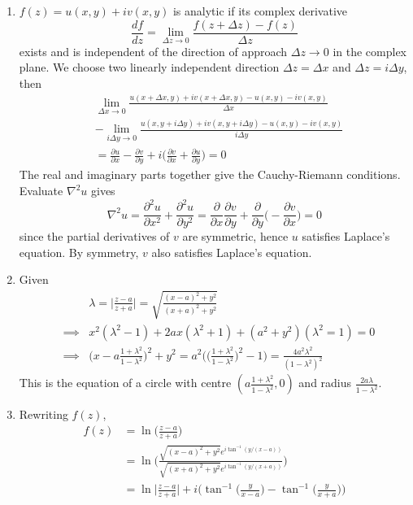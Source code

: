 \documentclass[a4paper]{article}
\begin{document}
\begin{ans}\leavevmode
\begin{enumerate}[label=(\roman*)]
\item $f(z)=u(x,y)+iv(x,y)$ is analytic if its complex derivative
$$\frac{df}{dz}=\lim_{\Delta z\rightarrow0}\frac{f(z+\Delta z)-f(z)}{\Delta z}$$
exists and is independent of the direction of approach $\Delta z\rightarrow 0$ in the complex plane. We choose two linearly independent direction $\Delta z=\Delta x$ and $\Delta z=i\Delta y$, then
\begin{align}
    &\lim_{\Delta x\rightarrow 0}\frac{u(x+\Delta x,y)+iv(x+\Delta x,y)-u(x,y)-iv(x,y)}{\Delta x}\nonumber\\&-\lim_{i\Delta y\rightarrow0}\frac{u(x,y+i\Delta y)+iv(x,y+i\Delta y)-u(x,y)-iv(x,y)}{i\Delta y}\nonumber\\&=\frac{\partial u}{\partial x}-\frac{\partial v}{\partial y}+i\bigg(\frac{\partial v}{\partial x}+\frac{\partial u}{\partial y}\bigg)=0\nonumber
\end{align}
The real and imaginary parts together give the Cauchy-Riemann conditions. Evaluate $\nabla^2u$ gives
$$\nabla^2u=\frac{\partial^2u}{\partial x^2}+\frac{\partial^2u}{\partial y^2}=\frac{\partial}{\partial x}\frac{\partial v}{\partial y}+\frac{\partial}{\partial y}\bigg(-\frac{\partial v}{\partial x}\bigg)=0$$
since the partial derivatives of $v$ are symmetric, hence $u$ satisfies Laplace's equation. By symmetry, $v$ also satisfies Laplace's equation.
\item Given
\begin{eqnarray}
&&\lambda=\bigg|\frac{z-a}{z+a}\bigg|=\sqrt{\frac{(x-a)^2+y^2}{(x+a)^2+y^2}}\nonumber\\&\implies& x^2(\lambda^2-1)+2ax(\lambda^2+1)+(a^2+y^2)(\lambda^2=1)=0\nonumber\\&\implies&\bigg(x-a\frac{1+\lambda^2}{1-\lambda^2}\bigg)^2+y^2=a^2\bigg(\bigg(\frac{1+\lambda^2}{1-\lambda^2}\bigg)^2-1\bigg)=\frac{4a^2\lambda^2}{(1-\lambda^2)^2}\nonumber
\end{eqnarray}
This is the equation of a circle with centre $(a\frac{1+\lambda^2}{1-\lambda^2},0)$ and radius $\frac{2a\lambda}{1-\lambda^2}$.
\item Rewriting $f(z)$,
\begin{align}
f(z)&=\ln\bigg(\frac{z-a}{z+a}\bigg)\nonumber\\&=\ln\bigg(\frac{\sqrt{(x-a)^2+y^2}e^{i\tan^{-1}(y/(x-a))}}{\sqrt{(x+a)^2+y^2}e^{i\tan^{-1}(y/(x+a))}}\bigg)\nonumber\\&=\ln\bigg|\frac{z-a}{z+a}\bigg|+i\bigg(\tan^{-1}\bigg(\frac{y}{x-a}\bigg)-\tan^{-1}\bigg(\frac{y}{x+a}\bigg)\bigg)\nonumber

\end{align}
\end{enumerate}
\end{ans}
\end{document}
